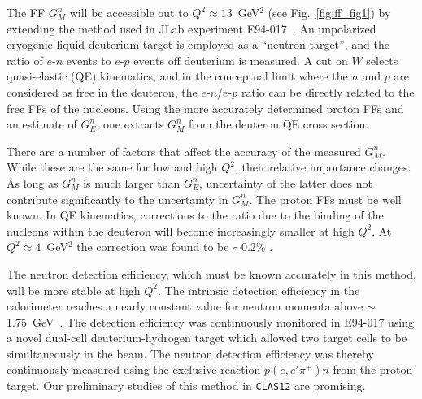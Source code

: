 The FF $G_M^n$ will be accessible out to $Q^2 \approx 13$~GeV$^2$
(see Fig.~\ref{fig:ff_fig1}) by extending the method used in JLab 
experiment E94-017~\cite{E94-017}.  An unpolarized cryogenic 
liquid-deuterium target is employed as a ``neutron target'', and the 
ratio of $e$-$n$ events to $e$-$p$ events off deuterium is measured.  A 
cut on $W$ selects quasi-elastic (QE) kinematics, and in the conceptual 
limit where the $n$ and $p$ are considered as free in the deuteron, 
the $e$-$n$/$e$-$p$ ratio can be directly related to the free FFs of the 
nucleons. Using the more accurately determined proton FFs and an estimate 
of $G_E^n$, one extracts $G_M^n$ from the deuteron QE cross section.

There are a number of factors that affect the accuracy of the measured
$G_M^n$. While these are the same for low and high $Q^2$, their relative 
importance changes. As long as $G_M^n$ is much larger than $G_E^n$, 
uncertainty of the latter does not contribute significantly to the
uncertainty in $G_M^n$. The proton FFs must be well known.  In QE 
kinematics, corrections to the ratio due to the binding of the nucleons 
within the deuteron will become increasingly smaller at high $Q^2$.  At 
$Q^2 \approx 4$~GeV$^2$ the correction was found to be $\sim$0.2\%
\cite{sj1,ha1,jlthesis}.

The neutron detection efficiency, which must be known accurately in this 
method, will be more stable at high $Q^2$.  The intrinsic detection 
efficiency in the calorimeter reaches a nearly constant value for neutron 
momenta above $\sim$1.75~GeV~\cite{jlthesis}.  The detection efficiency 
was continuously monitored in E94-017 using a novel dual-cell 
deuterium-hydrogen target which allowed two target cells to be 
simultaneously in the beam.  The neutron detection efficiency was thereby 
continuously measured using the exclusive reaction $p(e,e'\pi^+)n$ from 
the proton target.  Our preliminary studies of this method in {\tt CLAS12} 
are promising.  

